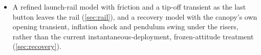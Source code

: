 \documentclass[10pt]{extarticle}
\numberwithin{equation}{subsection}
\begin{document}
\begin{itemize}
    the item above and is unblocked by the same mechanism: a filter state is exactly the recursive
    per-tick quantity \autoref{eq:zoh} carries. \emph{Waiting on:} the filter's own discretisation,
    and a decision on whether drawing noise per tick turns the flight into a stochastic
    differential equation whose results then depend on the sample rate itself --- a genuine
    modelling question, not an implementation detail.
    \item A refined launch-rail model with friction and a tip-off transient as the last button
    leaves the rail (\autoref{sec:rail}), and a recovery model with the canopy's own opening
    transient, inflation shock and pendulum swing under the risers, rather than the current
    instantaneous-deployment, frozen-attitude treatment (\autoref{sec:recovery}).
\end{itemize}
\end{document}
